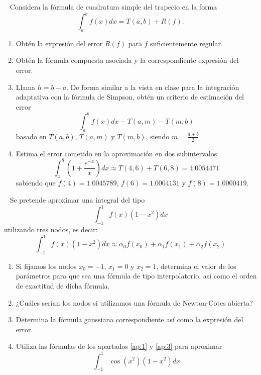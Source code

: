 \begin{ejercicio}~\label{ej:2.3.3}
    Considera la fórmula de cuadratura simple del trapecio en la forma
    \begin{equation*}
        \int_{a}^{b} f(x) dx = T(a, b) + R(f).
    \end{equation*}
    \begin{enumerate}
        \item Obtén la expresión del error $R(f)$ para $f$ suficientemente regular.
        \item Obtén la fórmula compuesta asociada y la correspondiente expresión del error.
        \item Llama $h = b - a$. De forma similar a la vista en clase para la integración adaptativa con la fórmula de Simpson, obtén un criterio de estimación del error
        \begin{equation*}
            \int_{a}^{b} f(x) dx - T(a, m) - T(m, b)
        \end{equation*}
        basado en $T(a, b)$, $T(a, m)$ y $T(m, b)$, siendo $m = \frac{a+b}{2}$.
        \item Estima el error cometido en la aproximación en dos subintervalos
        \begin{equation*}
            \int_{4}^{8} \left(1 + \frac{e^{-x}}{x}\right)dx \approx T(4, 6) + T(6, 8) = 4.0054471
        \end{equation*}
        sabiendo que $f(4) = 1.0045789$, $f(6) = 1.0004131$ y $f(8) = 1.0000419$.
    \end{enumerate}
\end{ejercicio}

\begin{ejercicio}~\label{ej:2.3.4}
    Se pretende aproximar una integral del tipo
    \begin{equation*}
        \int_{-1}^{1} f(x)(1 - x^2)dx
    \end{equation*}
    utilizando tres nodos, es decir:
    \begin{equation*}
        \int_{-1}^{1} f(x)(1 - x^2)dx \approx \alpha_0 f(x_0) + \alpha_1 f(x_1) + \alpha_2 f(x_2)
    \end{equation*}
    \begin{enumerate}
        \item\label{ap:1} Si fijamos los nodos $x_0 = -1$, $x_1 = 0$ y $x_2 = 1$, determina el valor de los parámetros para que sea una fórmula de tipo interpolatorio, así como el orden de exactitud de dicha fórmula.
        \item ¿Cuáles serían los nodos si utilizamos una fórmula de Newton-Cotes abierta?
        \item\label{ap:3} Determina la fórmula gaussiana correspondiente así como la expresión del error.
        \item Utiliza las fórmulas de los apartados \ref{ap:1} y \ref{ap:3} para aproximar
        \begin{equation*}
            \int_{-1}^{1} \cos(x^2)(1 - x^2)dx
        \end{equation*}
    \end{enumerate}
\end{ejercicio}

